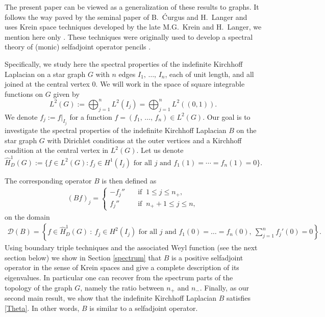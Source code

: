 \documentclass{article}
\numberwithin{equation}{section}
\theoremstyle{definition}
\newcommand{\mD}{\mathcal{D}}
\newcommand{\AKone}{B}
\begin{document}
\smallskip
The present paper can be viewed as a generalization of these results to graphs. It follows the way paved by the seminal paper of B.~{\'C}urgus and H.\ Langer \cite{CurgusLanger1989} and uses Krein space techniques developed by the late M.G.\ Krein and H.\ Langer, we mention here only  \cite{IKL,K70,L65,La}.
These techniques were originally used to develop a spectral theory of (monic) selfadjoint operator pencils \cite{L67,L73,L74,L75}.

Specifically, we study here the spectral properties of the indefinite Kirchhoff Laplacian on a star graph $G$ with $n$ edges $I_1,\, \dots,\, I_n$, each of unit length, and all joined at the central vertex $0$. 
We will work in the space of square integrable functions on $G$ given by
\begin{equation}
\label{eq:hilbert_graph}
	L^2(G) := \bigoplus_{j=1}^n L^2(I_j) = 
    \bigoplus_{j=1}^n L^2((0,1)). 
\end{equation}
%
We denote $f_j := f|_{I_j}$ for a function $f=(f_1,\, \dots,\, f_n)\in L^2(G)$.
Our goal is to investigate the spectral properties of the indefinite Kirchhoff Laplacian $\AKone$ on the star graph $G$ with Dirichlet conditions at the outer vertices and a Kirchhoff condition at the central vertex in $L^2(G)$.
Let us denote 
\begin{equation}
   \label{eq:hilbert_graph.dirichlet}
   \widehat H^1_D(G) := \{ f\in L^2(G) : 
   f_j\in H^1(I_j) \text{ for all } j \text{ and }
   f_1(1) = \cdots = f_n(1) = 0 \}.
\end{equation}

The corresponding operator $\AKone$ is then defined as
\begin{align}
\label{DerAuserwaehlte}
   (\AKone f)_j = 
   \begin{cases}
      -f_j''\quad &\text{if }\ 1 \le j \le n_+,\\
      f_j''\quad &\text{if }\  n_+ + 1 \le j \le n,
   \end{cases}
\end{align}
on the domain
\begin{align}
\label{ElDominio}
   \mD(B) = \left\{ f\in \widehat H_D^1(G)\ : \
   f_j\in H^2(I_j) \text{ for all } j \text{ and }
   f_1(0) = \dots = f_n(0), ~ \sum_{j=1}^n f_j'(0) = 0
\right\}.
\end{align}
Using boundary triple techniques and the associated Weyl function (see the next section below) we show in Section \ref{spectrum} that $B$ is a positive selfadjoint operator in the sense of Krein spaces and give a complete description of its eigenvalues.
In particular one can recover from the spectrum parts of the topology of the graph $G$, namely the ratio between $n_+$ and $n_-$. Finally, as our second main result, we show that the indefinite Kirchhoff Laplacian $B$ satisfies \eqref{Theta}. In other words, $B$ is similar to a selfadjoint operator.
\end{document}

